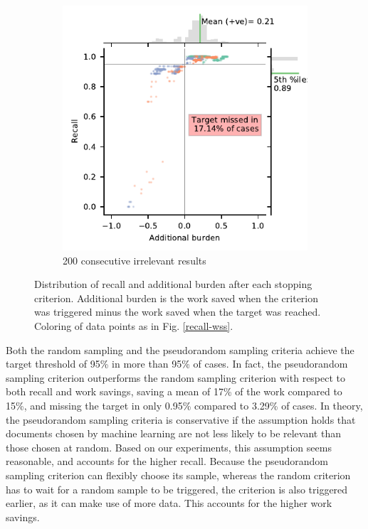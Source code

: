 \documentclass{bmcart}
\begin{document}
\begin{figure}
\begin{subfigure}[b]{0.475\textwidth}
	\end{subfigure}
	\hfill
	\begin{subfigure}[b]{0.475\textwidth}   
		\centering 
		\includegraphics[width=\textwidth]{../images/jointplot_burden_ih_200.pdf}
		\caption[]%
		{{\footnotesize 200 consecutive irrelevant results }}    
		\label{fig:ih_100_ab}
	\end{subfigure}
	
	\caption{\small Distribution of recall and additional burden after each stopping criterion. Additional burden is the work saved when the criterion was triggered minus the work saved when the target was reached. Coloring of data points as in Fig. \ref{recall-wss}.}
	\label{recall-burden}
\end{figure}


	
	Both the random sampling and the pseudorandom sampling criteria achieve the target threshold of 95\% in more than 95\% of cases. In fact, the pseudorandom sampling criterion  outperforms the random sampling criterion with respect to both recall and work savings, saving a mean of 17\% of the work compared to 15\%, and missing the target in only 0.95\% compared to 3.29\% of cases. In theory, the pseudorandom sampling criteria is conservative if the assumption holds that documents chosen by machine learning are not less likely to be relevant than those chosen at random. Based on our experiments, this assumption seems reasonable, and accounts for the higher recall. Because the pseudorandom sampling criterion can flexibly choose its sample, whereas the random criterion has to wait for a random sample to be triggered, the criterion is also triggered earlier, as it can make use of more data. This accounts for the higher work savings.
	
\end{document}
